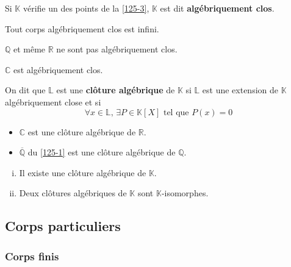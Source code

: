 	\begin{definition}
		Si $\mathbb{K}$ vérifie un des points de la \cref{125-3}, $\mathbb{K}$ est dit \textbf{algébriquement clos}.
	\end{definition}
	
	\begin{proposition}
		Tout corps algébriquement clos est infini.
	\end{proposition}
	
	\begin{cexample}
		$\mathbb{Q}$ et même $\mathbb{R}$ ne sont pas algébriquement clos.
	\end{cexample}
	
	\begin{theorem}
		$\mathbb{C}$ est algébriquement clos.
	\end{theorem}
	
	\begin{definition}
		On dit que $\mathbb{L}$ est une \textbf{clôture algébrique} de $\mathbb{K}$ si $\mathbb{L}$ est une extension de $\mathbb{K}$ algébriquement close et si
		\[ \forall x \in \mathbb{L}, \, \exists P \in \mathbb{K}[X] \text{ tel que } P(x) = 0 \]
	\end{definition}
	
	\begin{example}
		\begin{itemize}
			\item $\mathbb{C}$ est une clôture algébrique de $\mathbb{R}$.
			\item $\overline{\mathbb{Q}}$ du \cref{125-1} est une clôture algébrique de $\mathbb{Q}$.
		\end{itemize}
	\end{example}
	
	\begin{theorem}[Steinitz]
		\begin{enumerate}[(i)]
			\item Il existe une clôture algébrique de $\mathbb{K}$.
			\item Deux clôtures algébriques de $\mathbb{K}$ sont $\mathbb{K}$-isomorphes.
		\end{enumerate}
	\end{theorem}
	
	\subsection{Corps particuliers}
	
	\subsubsection{Corps finis}
	
